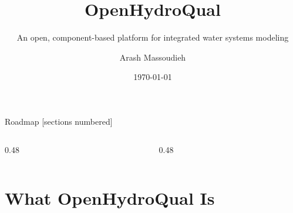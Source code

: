 \documentclass[aspectratio=169, 10pt]{beamer}
\title{OpenHydroQual}
\subtitle{An open, component-based platform for integrated water systems modeling}
\author{Arash Massoudieh}
\institute{EnviroInformatics, LLC \quad\textbar\quad The Catholic University of America}
\date{\today}
\begin{document}
\maketitle

\begin{frame}{Roadmap}
  [sections numbered]
  \begin{columns}[T,onlytextwidth]
    \begin{column}{0.48\textwidth}
      \tableofcontents[hideallsubsections, sections={1-4}]
    \end{column}
    \begin{column}{0.48\textwidth}
      \tableofcontents[hideallsubsections, sections={5-8}]
    \end{column}
  \end{columns}
\end{frame}

\section{What OpenHydroQual Is}
\end{document}
